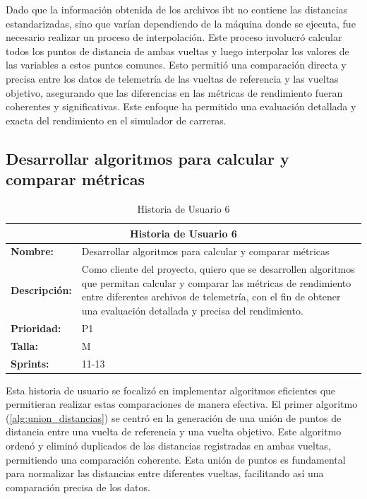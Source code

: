 Dado que la información obtenida de los archivos \ac{ibt} no contiene las distancias estandarizadas, sino que varían dependiendo de la máquina donde se ejecuta, fue necesario realizar un proceso de interpolación. Este proceso involucró calcular todos los puntos de distancia de ambas vueltas y luego interpolar los valores de las variables a estos puntos comunes. Esto permitió una comparación directa y precisa entre los datos de telemetría de las vueltas de referencia y las vueltas objetivo, asegurando que las diferencias en las métricas de rendimiento fueran coherentes y significativas. Este enfoque ha permitido una evaluación detallada y exacta del rendimiento en el simulador de carreras.

\subsection{Desarrollar algoritmos para calcular y comparar métricas}
\begin{table}[H]
\centering
\begin{tabular}{|l|p{10cm}|}
\hline
\multicolumn{2}{|c|}{\textbf{Historia de Usuario 6}} \\ \hline
\textbf{Nombre:} & Desarrollar algoritmos para calcular y comparar métricas \\ \hline
\textbf{Descripción:} & Como cliente del proyecto, quiero que se desarrollen algoritmos que permitan calcular y comparar las métricas de rendimiento entre diferentes archivos de telemetría, con el fin de obtener una evaluación detallada y precisa del rendimiento. \\ \hline
\textbf{Prioridad:} & P1 \\ \hline
\textbf{Talla:} & M \\ \hline
\textbf{Sprints:} & 11-13 \\ \hline
\end{tabular}
\caption{Historia de Usuario 6}
\label{tab:algoritmos_metricas}
\end{table}

Esta historia de usuario se focalizó en implementar algoritmos eficientes que permitieran realizar estas comparaciones de manera efectiva. El primer algoritmo (\autoref{alg:union_distancias}) se centró en la generación de una unión de puntos de distancia entre una vuelta de referencia y una vuelta objetivo. Este algoritmo ordenó y eliminó duplicados de las distancias registradas en ambas vueltas, permitiendo una comparación coherente. Esta unión de puntos es fundamental para normalizar las distancias entre diferentes vueltas, facilitando así una comparación precisa de los datos.


